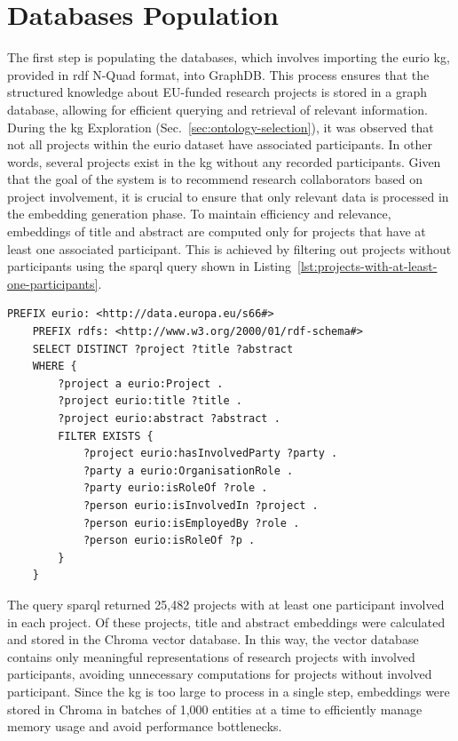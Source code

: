 \section{Databases Population}\label{sec:databases-population}
The first step is populating the databases, which involves importing the \gls{eurio} \gls{kg}, provided in \gls{rdf} N-Quad format, into GraphDB.
This process ensures that the structured knowledge about EU-funded research projects is stored in a graph database, allowing for efficient querying and retrieval of relevant information.
During the \acrlong{kg} Exploration (Sec.~\ref{sec:ontology-selection}), it was observed that not all projects within the \gls{eurio} dataset have associated participants.
In other words, several projects exist in the \gls{kg} without any recorded participants.
Given that the goal of the system is to recommend research collaborators based on project involvement, it is crucial to ensure that only relevant data is processed in the embedding generation phase.
To maintain efficiency and relevance, embeddings of title and abstract are computed only for projects that have at least one associated participant.
This is achieved by filtering out projects without participants using the \gls{sparql} query shown in Listing~\ref{lst:projects-with-at-least-one-participants}.

\begin{lstlisting}[language=SPARQL, caption={\gls{sparql} query for getting the projects with at least one participant}, label={lst:projects-with-at-least-one-participants}]
    PREFIX eurio: <http://data.europa.eu/s66#>
    PREFIX rdfs: <http://www.w3.org/2000/01/rdf-schema#>
    SELECT DISTINCT ?project ?title ?abstract
    WHERE {
        ?project a eurio:Project .
        ?project eurio:title ?title .
        ?project eurio:abstract ?abstract .
        FILTER EXISTS {
            ?project eurio:hasInvolvedParty ?party .
            ?party a eurio:OrganisationRole .
            ?party eurio:isRoleOf ?role .
            ?person eurio:isInvolvedIn ?project .
            ?person eurio:isEmployedBy ?role .
            ?person eurio:isRoleOf ?p .
        }
    }
\end{lstlisting}

The query \gls{sparql} returned 25,482 projects with at least one participant involved in each project.
Of these projects, title and abstract embeddings were calculated and stored in the Chroma vector database.
In this way, the vector database contains only meaningful representations of research projects with involved participants, avoiding unnecessary computations for projects without involved participant.
Since the \gls{kg} is too large to process in a single step, embeddings were stored in Chroma in batches of 1,000 entities at a time to efficiently manage memory usage and avoid performance bottlenecks.

